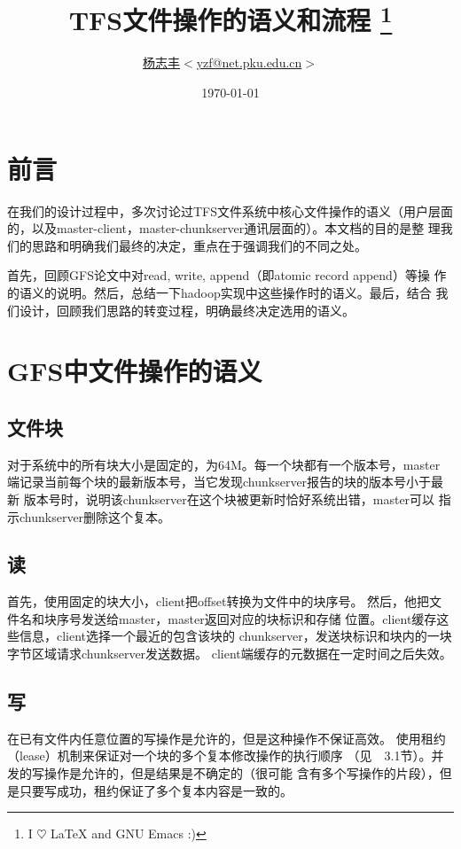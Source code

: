 \documentclass[11pt,a4paper]{scrartcl}
\begin{document}
\begin{CJK*}{UTF8}{gbsn}
\title{TFS文件操作的语义和流程 \protect\footnote{I $\heartsuit$ \LaTeX{} and GNU Emacs :)}}
\author{\href{http://net.pku.edu.cn/~yzf/}{杨志丰}$<$\href{mailto:yzf@net.pku.edu.cn}{yzf@net.pku.edu.cn}$>$}
\date{\today}
\maketitle

\section*{前言}
在我们的设计过程中，多次讨论过TFS文件系统中核心文件操作的语义（用户层面
的，以及master-client，master-chunkserver通讯层面的）。本文档的目的是整
理我们的思路和明确我们最终的决定，重点在于强调我们的不同之处。

首先，回顾GFS论文中对read, write, append（即atomic record append）等操
作的语义的说明。然后，总结一下hadoop实现中这些操作时的语义。最后，结合
我们设计，回顾我们思路的转变过程，明确最终决定选用的语义。
\section{GFS中文件操作的语义}
\subsection{文件块}
对于系统中的所有块大小是固定的，为64M。每一个块都有一个版本号，master
端记录当前每个块的最新版本号，当它发现chunkserver报告的块的版本号小于最新
版本号时，说明该chunkserver在这个块被更新时恰好系统出错，master可以
指示chunkserver删除这个复本。
\subsection{读}
首先，使用固定的块大小，client把offset转换为文件中的块序号。
然后，他把文件名和块序号发送给master，master返回对应的块标识和存储
位置。client缓存这些信息，client选择一个最近的包含该块的
chunkserver，发送块标识和块内的一块字节区域请求chunkserver发送数据。
client端缓存的元数据在一定时间之后失效。

\subsection{写}
在已有文件内任意位置的写操作是允许的，但是这种操作不保证高效。
使用租约（lease）机制来保证对一个块的多个复本修改操作的执行顺序
（见~\cite{gfs2003}~3.1节）。并发的写操作是允许的，但是结果是不确定的（很可能
含有多个写操作的片段），但是只要写成功，租约保证了多个复本内容是一致的。


\end{CJK*}
\end{document}
